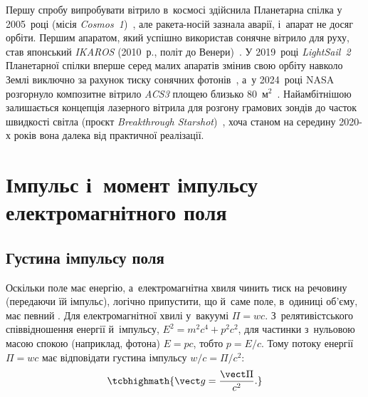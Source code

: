 \begin{Historical}
	Першу спробу випробувати вітрило в~космосі здійснила
	Планетарна спілка у 2005~році (місія \emph{Cosmos~1})~\cite{PlanetaryCosmos1}, але ракета-носій зазнала аварії,
	і~апарат не досяг орбіти. Першим апаратом, який успішно використав сонячне вітрило для руху, став японський \emph{IKAROS} (2010~р., політ до Венери)~\cite{Tsuda2013}. У 2019~році \emph{LightSail~2} Планетарної спілки вперше серед малих апаратів змінив свою орбіту навколо Землі виключно за рахунок тиску сонячних фотонів~\cite{PlanetaryLightSail2}, а~у 2024~році NASA розгорнуло композитне вітрило \emph{ACS3} площею близько $80$~м$^2$~\cite{NASA_ACS3}. Найамбітнішою залишається концепція лазерного вітрила для розгону грамових зондів до часток швидкості світла (проєкт \emph{Breakthrough Starshot})~\cite{BreakthroughStarshot}, хоча станом на середину 2020-х років вона далека від практичної реалізації.
\end{Historical}

\section{Імпульс і~момент імпульсу електромагнітного поля}\hypertarget{em-field-momentum}{}

\subsection*{Густина імпульсу поля}

Оскільки поле має енергію, а~електромагнітна хвиля чинить тиск на речовину (передаючи їй імпульс), логічно припустити, що й~саме поле, в~одиниці
об'єму, має певний . Для електромагнітної хвилі у~вакуумі $\Pi = wc$. З~релятивістського співвідношення
енергії й~імпульсу, $E^2 = m^2c^4+p^2c^2$, для частинки з~нульовою масою спокою (наприклад, фотона) $E=pc$, тобто $p=E/c$. Тому потоку
енергії $\Pi = wc$ має відповідати густина імпульсу $w/c = \Pi/c^2$:
\begin{equation}\label{eq:MomentumDensityDef}
	\tcbhighmath{
		\vect g = \frac{\vect\Pi}{c^2}.
	}
\end{equation}

